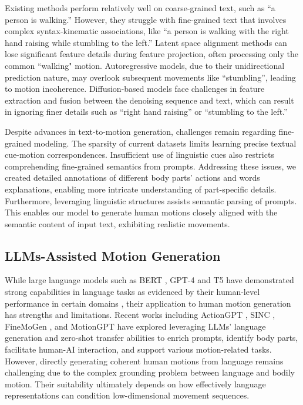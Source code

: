Existing methods perform relatively well on coarse-grained text, such as ``a person is walking.'' However, they struggle with fine-grained text that involves complex syntax-kinematic associations, like ``a person is walking with the right hand raising while stumbling to the left.'' Latent space alignment methods can lose significant feature details during feature projection, often processing only the common ``walking" motion. Autoregressive models, due to their unidirectional prediction nature, may overlook subsequent movements like ``stumbling'', leading to motion incoherence. Diffusion-based models face challenges in feature extraction and fusion between the denoising sequence and text, which can result in ignoring finer details such as ``right hand raising'' or ``stumbling to the left.''

Despite advances in text-to-motion generation, challenges remain regarding fine-grained modeling. The sparsity of current datasets limits learning precise textual cue-motion correspondences. Insufficient use of linguistic cues also restricts comprehending fine-grained semantics from prompts. Addressing these issues, we created detailed annotations of different body parts' actions and words explanations, enabling more intricate understanding of part-specific details. Furthermore, leveraging linguistic structures assists semantic parsing of prompts. This enables our model to generate human motions closely aligned with the semantic content of input text, exhibiting realistic movements.

\subsection{LLMs-Assisted Motion Generation}\label{sec2_2}

While large language models such as BERT \citep{devlin2018bert}, GPT-4 \citep{achiam2023gpt} and T5 \citep{raffel2020exploring} have demonstrated strong capabilities in language tasks as evidenced by their human-level performance in certain domains \citep{gilardi2023chatgpt}, their application to human motion generation has strengths and limitations. Recent works including ActionGPT \citep{kalakonda2023action}, SINC \citep{athanasiou2023sinc}, FineMoGen \citep{zhang2024finemogen}, and MotionGPT \citep{jiang2024motiongpt} have explored leveraging LLMs' language generation and zero-shot transfer abilities to enrich prompts, identify body parts, facilitate human-AI interaction, and support various motion-related tasks. However, directly generating coherent human motions from language remains challenging due to the complex grounding problem between language and bodily motion. Their suitability ultimately depends on how effectively language representations can condition low-dimensional movement sequences.

